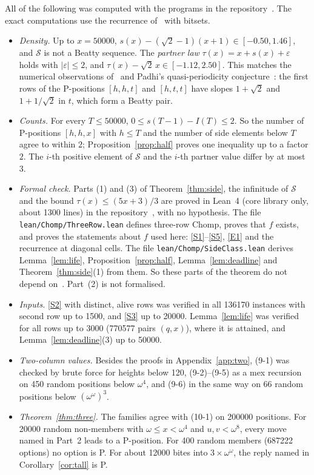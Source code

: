\documentclass[11pt]{amsart}
\theoremstyle{definition}
\theoremstyle{remark}
\newcommand{\Sc}{\mathcal{S}}
\begin{document}
All of the following was computed with the programs in the
repository~\cite{repo}. The exact computations
use the recurrence of~\cite{BHMS} with bitsets.
\begin{itemize}
\item \emph{Density.} Up to $x=50000$, $s(x)-(\sqrt2-1)(x+1)\in[-0.50,1.46]$, and $\Sc$ is not a
  Beatty sequence. The \emph{partner law} $\tau(x)=x+s(x)+\varepsilon$ holds with
  $|\varepsilon|\le2$, and $\tau(x)-\sqrt2\,x\in[-1.12,2.50]$. This matches the numerical
  observations of~\cite[\S8.6]{BHMS} and Padhi's quasi-periodicity
  conjecture~\cite[\S4.7]{Pa}: the first rows of the P-positions $[h,h,t]$ and $[h,t,t]$ have
  slopes $1+\sqrt2$ and $1+1/\sqrt2$ in $t$, which form a Beatty pair.
\item \emph{Counts.} For every $T\le50000$, $0\le s(T-1)-I(T)\le2$. So the number of P-positions
  $[h,h,x]$ with $h\le T$ and the number of side elements below $T$ agree to within $2$;
  Proposition~\ref{prop:half} proves one inequality up to a factor $2$. The $i$-th positive
  element of $\Sc$ and the $i$-th partner value differ by at most $3$.
\item \emph{Formal check.} Parts (1) and (3) of Theorem~\ref{thm:side}, the infinitude of
  $\Sc$ and the bound $\tau(x)\le(5x+3)/3$ are proved in Lean~4 (core library only, about 1300
  lines) in the repository~\cite{repo}, with no hypothesis. The file \texttt{lean/Chomp/ThreeRow.lean} defines
  three-row Chomp, proves that $f$ exists, and proves the statements about $f$ used here:
  \ref{S1}--\ref{S5}, \ref{E1} and the recurrence at diagonal cells. The file
  \texttt{lean/Chomp/SideClass.lean} derives Lemma~\ref{lem:life},
  Proposition~\ref{prop:half}, Lemma~\ref{lem:deadline} and Theorem~\ref{thm:side}(1) from
  them. So these parts of the theorem do not depend on~\cite{Sh}. Part~(2) is not
  formalised.
\item \emph{Inputs.} \ref{S2} with distinct, alive rows was verified in all 136170 instances
  with second row up to 1500, and \ref{S3} up to 20000. Lemma~\ref{lem:life} was verified for
  all rows up to 3000 (770577 pairs $(q,x)$), where it is attained, and
  Lemma~\ref{lem:deadline}(3) up to 50000.
\item \emph{Two-column values.} Besides the proofs in Appendix~\ref{app:two}, (9-1) was checked
  by brute force for heights below 120, (9-2)--(9-5) as a mex recursion on 450 random
  positions below $\omega^4$, and (9-6) in the same way on 66 random positions below
  $(\omega^\omega)^3$.
\item \emph{Theorem~\ref{thm:three}.} The families agree with (10-1) on 200000 positions. For
  20000 random non-members with $\omega\le x<\omega^4$ and $u,v<\omega^8$, every move named in
  Part~2 leads to a P-position. For 400 random members (687222 options) no option is P. For
  about 12000 bites into $3\times\omega^\omega$, the reply named in Corollary~\ref{cor:tall} is P.
\end{itemize}
\end{document}
